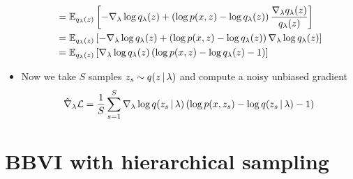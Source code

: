 \begin{itemize}
\begin{align*}
&= \mathbb{E}_{q_\lambda(z)}\left[ - \nabla_\lambda \log q_\lambda(z) + \left(\log p(x,z) - \log q_\lambda(z)\right) \frac{\nabla_\lambda q_\lambda(z)}{q_\lambda(z)} \right] \\
&= \mathbb{E}_{q_\lambda(z)}\left[ - \nabla_\lambda \log q_\lambda(z) + \left(\log p(x,z) - \log q_\lambda(z)\right) \nabla_\lambda \log q_\lambda(z) \right] \\
&= \mathbb{E}_{q_\lambda(z)}\left[ \nabla_\lambda \log q_\lambda(z) \left(\log p(x,z) - \log q_\lambda(z) - 1\right)  \right] \\
\end{align*}

\item Now we take $S$ samples $z_s \sim q(z \, | \, \lambda)$ and compute a noisy unbiased gradient
\[\hat\nabla_\lambda\mathcal{L} = \frac{1}{S} \sum_{s=1}^S \nabla_\lambda \log q(z_s \, | \, \lambda) \left(\log p(x,z_s) - \log q(z_s \, | \, \lambda) - 1\right) \]
\end{itemize}


\section{BBVI with hierarchical sampling}

